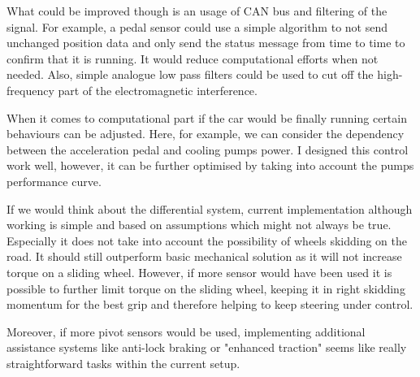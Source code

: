 What could be improved though is an usage of CAN bus and filtering of the signal. For example, a pedal sensor could use a simple algorithm to not send unchanged position data and only send the status message from time to time to confirm that it is running. It would reduce computational efforts when not needed. 
Also, simple analogue low pass filters could be used to cut off the high-frequency part of the electromagnetic interference.



When it comes to computational part if the car would be finally running certain behaviours can be adjusted. Here, for example, we can consider the dependency between the acceleration pedal and cooling pumps power. I designed this control work well, however, it can be further optimised by taking into account the pumps performance curve.


If we would think about the differential system, current implementation although working is simple and based on assumptions which might not always be true. Especially it does not take into account the possibility of wheels skidding on the road. It should still outperform basic mechanical solution as it will not increase torque on a sliding wheel. However, if more sensor would have been used it is possible to further limit torque on the sliding wheel, keeping it in right skidding momentum for the best grip and therefore helping to keep steering under control.

Moreover, if more pivot sensors would be used, implementing additional assistance systems like anti-lock braking or "enhanced traction" seems like really straightforward tasks within the current setup. 